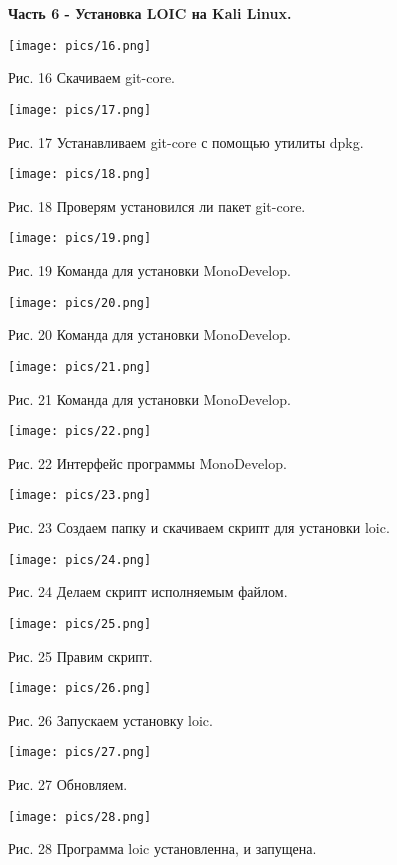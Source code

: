 \documentclass[a4paper,14pt]{extarticle}
\begin{document}
   \textbf{Часть 6 - Установка LOIC на Kali Linux.}
   \begin{center}
        \texttt{[image: pics/16.png]}

        Рис. 16 Скачиваем git-core.
        \vspace{1ex}

        \texttt{[image: pics/17.png]}

        Рис. 17 Устанавливаем git-core с помощью утилиты dpkg.
        \vspace{1ex}

        \texttt{[image: pics/18.png]}

        Рис. 18 Проверям установился ли пакет git-core.
        \vspace{1ex}

        \texttt{[image: pics/19.png]}

        Рис. 19 Команда для установки MonoDevelop.
        \vspace{1ex}

        \texttt{[image: pics/20.png]}

        Рис. 20 Команда для установки MonoDevelop.
        \vspace{1ex}

        \texttt{[image: pics/21.png]}

        Рис. 21 Команда для установки MonoDevelop.
        \vspace{1ex}

        \texttt{[image: pics/22.png]}

        Рис. 22 Интерфейс программы MonoDevelop.
        \vspace{1ex}

        \texttt{[image: pics/23.png]}

        Рис. 23 Создаем папку и скачиваем скрипт для установки loic.
        \vspace{1ex}

        \texttt{[image: pics/24.png]}

        Рис. 24 Делаем скрипт исполняемым файлом.
        \vspace{1ex}

        \texttt{[image: pics/25.png]}

        Рис. 25 Правим скрипт.
        \vspace{1ex}

        \texttt{[image: pics/26.png]}

        Рис. 26 Запускаем установку loic.
        \vspace{1ex}

        \texttt{[image: pics/27.png]}

        Рис. 27 Обновляем.
        \vspace{1ex}

        \texttt{[image: pics/28.png]}

        Рис. 28 Программа loic установленна, и запущена. 
        \vspace{1ex}

    \end{center}
    
\end{document}
